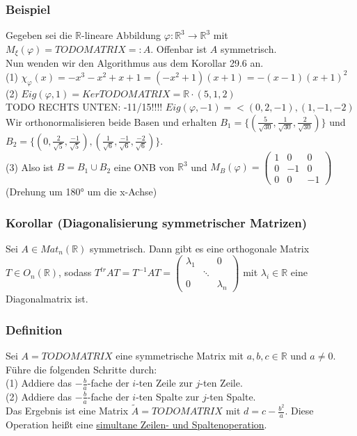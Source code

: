 \documentclass[a4paper]{article}
\newcommand{\ul}{\underline}
\let\phi\varphi
\begin{document}
\subsubsection{Beispiel}
Gegeben sei die \(\mathbb{R}\)-lineare Abbildung \(\phi:\mathbb{R}^3\rightarrow\mathbb{R}^3\) mit \(M_\xi(\phi)=TODO MATRIX=: A\). Offenbar ist \(A\) symmetrisch.\\
Nun wenden wir den Algorithmus aus dem Korollar 29.6 an.\\
(1) \(\chi_\phi(x)=-x^3-x^2+x+1=(-x^2+1)(x+1)=-(x-1)(x+1)^2\)\\
(2) \(Eig(\phi,1)=Ker TODO MATRIX=\mathbb{R}\cdot (5,1,2)\)\\
TODO RECHTS UNTEN: -11/15!!!!
\(Eig(\phi,-1)=<(0,2,-1),(1,-1,-2)\)\\
Wir orthonormalisieren beide Basen und erhalten \(B_1=\{(\frac{5}{\sqrt{30}},\frac{1}{\sqrt{30}},\frac{2}{\sqrt{30}})\}\) und \(B_2=\{(0,\frac{2}{\sqrt{5}},\frac{-1}{\sqrt{5}}),(\frac{1}{\sqrt{6}},\frac{-1}{\sqrt{6}},\frac{-2}{\sqrt{6}})\}\).\\
(3) Also ist \(B=B_1\cup B_2\) eine ONB von \(\mathbb{R}^3\) und \(M_B(\phi)=\begin{pmatrix}
1 & 0 & 0\\
0 & -1 & 0\\
0 & 0 & -1
\end{pmatrix}\) (Drehung um 180° um die x-Achse)
\subsubsection{Korollar (Diagonalisierung symmetrischer Matrizen)}
Sei \(A \in Mat_n(\mathbb{R})\) symmetrisch. Dann gibt es eine orthogonale Matrix \(T\in O_n(\mathbb{R})\), sodass \(T^{tr}AT=T^{-1}AT=\begin{pmatrix}
\lambda_1 & & 0\\
 & \ddots & \\
0 & & \lambda_n
\end{pmatrix}\) mit \(\lambda_i\in\mathbb{R}\) eine Diagonalmatrix ist.
\subsubsection{Definition}
Sei \(A=TODO MATRIX\) eine symmetrische Matrix mit \(a,b,c\in\mathbb{R}\) und \(a\neq 0\).\\
Führe die folgenden Schritte durch:\\
(1) Addiere das \(-\frac{b}{a}\)-fache der \(i\)-ten Zeile zur \(j\)-ten Zeile.\\
(2) Addiere das \(-\frac{b}{a}\)-fache der \(i\)-ten Spalte zur \(j\)-ten Spalte.\\
Das Ergebnis ist eine Matrix \(\tilde{A}=TODO MATRIX\) mit \(d=c-\frac{b^2}{a}\). Diese Operation heißt eine \ul{simultane Zeilen- und Spaltenoperation}.
\end{document}
